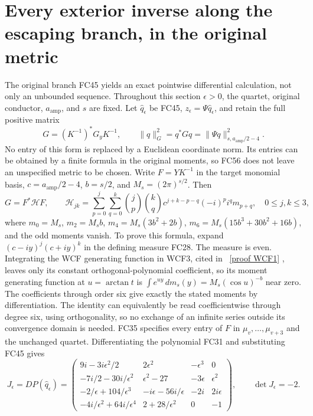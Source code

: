 \documentclass[11pt]{article}
\begin{document}
\section{Every exterior inverse along the escaping branch, in the original metric}
The original branch FC45 yields an exact pointwise differential calculation,
not only an unbounded sequence. Throughout this section $\epsilon>0$, the
quartet, original conductor, $a_{\mathrm{amp}}$, and $s$ are fixed. Let
$\widehat q_\epsilon$ be FC45, $z_\epsilon=\Psi\widehat q_\epsilon$,
and retain the full positive matrix
\[
 G=(K^{-1})^*G_yK^{-1},\qquad
 \|q\|_G^2=q^*Gq=\|\Psi q\|_{s,a_{\mathrm{amp}}/2-4}^2.
 \tag{FC56}
\]
No entry of this form is replaced by a Euclidean coordinate norm.
Its entries can be obtained by a finite formula in the original moments,
so FC56 does not leave an unspecified metric to be chosen. Write
$F=YK^{-1}$ in the target monomial basis, $c=a_{\mathrm{amp}}/2-4$,
$b=s/2$, and $M_s=(2\pi)^{s/2}$. Then
\[
 G=F^*\mathcal H F,\qquad
 \mathcal H_{jk}=\sum_{p=0}^j\sum_{q=0}^k
 \binom jp\binom kq c^{j+k-p-q}(-i)^p i^q m_{p+q},
 \quad 0\le j,k\le3,
 \tag{FC56a}
\]
where $m_0=M_s$, $m_2=M_sb$, $m_4=M_s(3b^2+2b)$,
$m_6=M_s(15b^3+30b^2+16b)$, and the odd moments vanish.
To prove this formula, expand
$(c-iy)^j(c+iy)^k$ in the defining measure FC28. The measure is
even. Integrating the WCF generating function in WCF3, cited in
\cite{WCF}%
~\href{https://github.com/KokunoYumeto/zeta-function-research-reader/blob/5992ad50c0f2a06921f1fcaded7b4e38097c0739/workbenches/splitzero-tandem/continuations/20260920-original-kernel-mixed-determinants/providers/WEIGHTED_CONDUCTOR_FORWARD.tex\#L28}{[proof WCF1]}%
{}, leaves only its constant orthogonal-polynomial coefficient,
so its moment generating function at $u=\arctan t$ is
$\int e^{uy}\,dm_s(y)=M_s(\cos u)^{-b}$ near zero. The coefficients
through order six give exactly the stated moments by differentiation.
The identity can equivalently be read coefficientwise through degree
six, using orthogonality, so no exchange of an infinite series outside
its convergence domain is needed. FC35 specifies every entry of $F$
in $\mu_v,\ldots,\mu_{v+3}$ and the unchanged quartet.
Differentiating the polynomial FC31 and substituting FC45 gives
\[
 J_\epsilon=DP(\widehat q_\epsilon)=
 \begin{pmatrix}
 9i-3i\epsilon^2/2&2\epsilon^2&-\epsilon^3&0\\
 -7i/2-30i/\epsilon^2&\epsilon^2-27&-3\epsilon&\epsilon^2\\
 -2/\epsilon+104/\epsilon^3&-i\epsilon-56i/\epsilon&-2i&2i\epsilon\\
 -4i/\epsilon^2+64i/\epsilon^4&2+28/\epsilon^2&0&-1
 \end{pmatrix},\qquad \det J_\epsilon=-2.
 \tag{FC57}
\]
\end{document}
